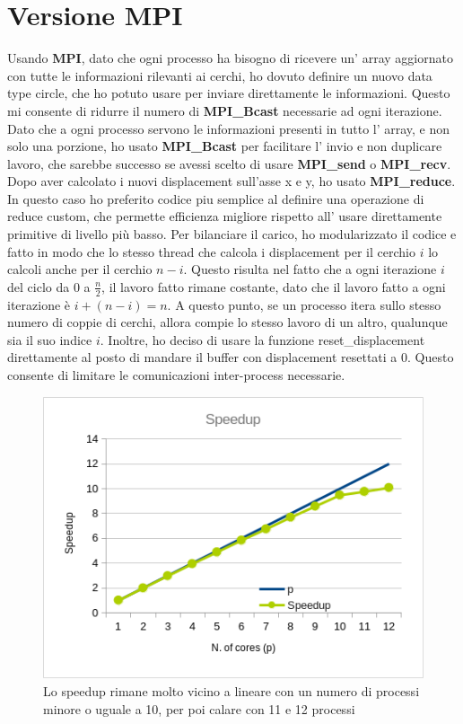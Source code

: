 \documentclass[a4paper,11pt, twoside]{report}
\begin{document}
\section*{Versione MPI}
Usando \textbf{MPI}, dato che ogni processo ha bisogno di ricevere un' array aggiornato con tutte le informazioni rilevanti ai cerchi, 
ho dovuto definire un nuovo data type circle, che ho potuto usare per inviare direttamente le informazioni. 
Questo mi consente di ridurre il numero di \textbf{MPI\_Bcast} necessarie ad ogni iterazione.
Dato che a ogni processo servono le informazioni presenti in tutto l' array, e non solo una porzione, ho usato \textbf{MPI\_Bcast} per facilitare l' invio e non duplicare lavoro,
che sarebbe successo se avessi scelto di usare \textbf{MPI\_send} o  \textbf{MPI\_recv}.
Dopo aver calcolato i nuovi displacement sull'asse x e y, ho usato \textbf{MPI\_reduce}. 
In questo caso ho preferito codice piu semplice al definire una operazione di reduce custom,
che permette efficienza migliore rispetto all' usare direttamente primitive di livello più basso.
Per bilanciare il carico, ho modularizzato il codice e fatto in modo che lo stesso thread che calcola i displacement per il cerchio $i$ lo calcoli anche per il cerchio $n-i$.
Questo risulta nel fatto che a ogni iterazione $i$ del ciclo da $0$ a $\frac{n}{2}$, il lavoro fatto rimane costante, dato che il lavoro fatto a ogni iterazione è $i + (n-i) = n$.
A questo punto, se un processo itera sullo stesso numero di coppie di cerchi, allora compie lo stesso lavoro di un altro, qualunque sia il suo indice $i$.
Inoltre, ho deciso di usare la funzione reset\_displacement direttamente al posto di mandare il buffer con displacement resettati a 0.
Questo consente di limitare le comunicazioni inter-process necessarie.
\begin{figure}
    \includegraphics[scale=0.5]{images/mpi_speedup.png}
    \caption[]{Lo speedup rimane molto vicino a lineare con un numero di processi minore o uguale a 10, per poi calare con 11 e 12 processi}
\end{figure}
\end{document}
